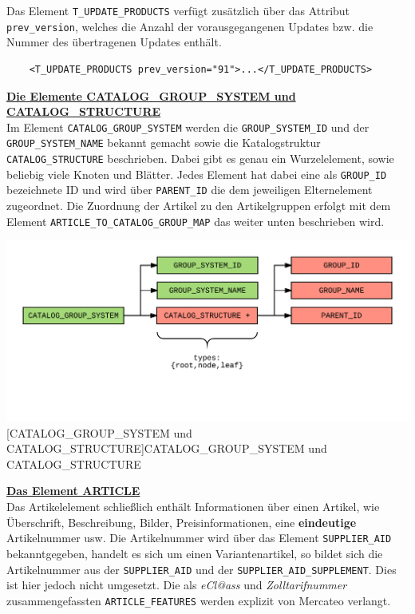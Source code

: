 	Das Element \texttt{T\_UPDATE\_PRODUCTS} verfügt zusätzlich über das Attribut \texttt{prev\_version}, welches die Anzahl der vorausgegangenen Updates bzw. die Nummer des übertragenen Updates enthält. 
	
	\begin{lstlisting}
	<T_UPDATE_PRODUCTS prev_version="91">...</T_UPDATE_PRODUCTS>
	\end{lstlisting}
	
	
	
	\textbf{\underline{Die Elemente CATALOG\_GROUP\_SYSTEM und CATALOG\_STRUCTURE}}\\
	
	Im Element \texttt{CATALOG\_GROUP\_SYSTEM} werden die \texttt{GROUP\_SYSTEM\_ID} und der \texttt{GROUP\_SYSTEM\_NAME} bekannt gemacht sowie die Katalogstruktur  \texttt{CATALOG\_STRUCTURE}   beschrieben. Dabei gibt es genau ein Wurzelelement, sowie beliebig viele Knoten und Blätter. Jedes Element hat dabei eine als \texttt{GROUP\_ID} bezeichnete ID und wird über \texttt{PARENT\_ID} die  dem jeweiligen Elternelement zugeordnet. Die Zuordnung der Artikel zu den Artikelgruppen erfolgt mit dem Element \texttt{ARTICLE\_TO\_CATALOG\_GROUP\_MAP} das weiter unten beschrieben wird.
	
	\begin{minipage}{\linewidth}
		\vspace{1em}
		\centering
		\includegraphics[width=0.7\linewidth]{img/catalogGroupSystem}
		[CATALOG\_GROUP\_SYSTEM und CATALOG\_STRUCTURE]{CATALOG\_GROUP\_SYSTEM und CATALOG\_STRUCTURE}
		\label{fig:header}
		\vspace{1em}
	\end{minipage} \pagebreak
	
	\textbf{\underline{Das Element ARTICLE}}\\
	Das Artikelelement schließlich enthält Informationen über einen Artikel, wie Überschrift, Beschreibung, Bilder, Preisinformationen, eine \textbf{eindeutige} Artikelnummer usw. Die Artikelnummer wird über das Element \texttt{SUPPLIER\_AID} bekanntgegeben, handelt es sich um einen Variantenartikel, so bildet sich die Artikelnummer aus der \texttt{SUPPLIER\_AID} und der \texttt{SUPPLIER\_AID\_SUPPLEMENT}. Dies ist hier jedoch nicht umgesetzt. Die als \textit{eCl@ass} und \textit{Zolltarifnummer} zusammengefassten \texttt{ARTICLE\_FEATURES} werden explizit von Mercateo verlangt.
	
